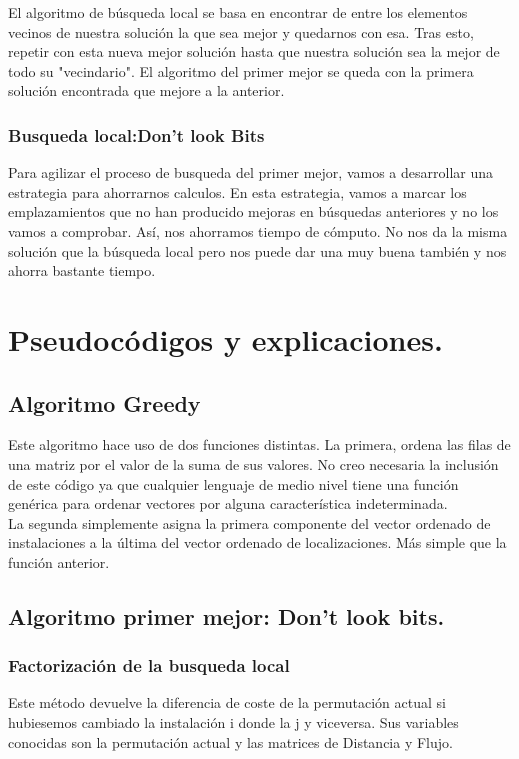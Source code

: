 El algoritmo de búsqueda local se basa en encontrar de entre los elementos vecinos de nuestra solución la que sea mejor y quedarnos con esa. Tras esto, repetir con esta nueva mejor solución hasta que nuestra solución sea la mejor de todo su "vecindario". El algoritmo del primer mejor se queda con la primera solución encontrada que mejore a la anterior.

\subsubsection{Busqueda local:Don't look Bits}
Para agilizar el proceso de busqueda del primer mejor, vamos a desarrollar una estrategia para ahorrarnos calculos. En esta estrategia, vamos a marcar los emplazamientos que no han producido mejoras en búsquedas anteriores y no los vamos a comprobar. Así, nos ahorramos tiempo de cómputo. No nos da la misma solución que la búsqueda local pero nos puede dar una muy buena también y nos ahorra bastante tiempo.

\newpage
\section{Pseudocódigos y explicaciones.}

\subsection{Algoritmo Greedy}
Este algoritmo hace uso de dos funciones distintas. La primera, ordena las filas de una matriz por el valor de la suma de sus valores. No creo necesaria la inclusión de este código ya que cualquier lenguaje de medio nivel tiene una función genérica para ordenar vectores por alguna característica indeterminada. \\
La segunda simplemente asigna la primera componente del vector ordenado de instalaciones a la última del vector ordenado de localizaciones. Más simple que la función anterior.

\subsection{Algoritmo primer mejor: Don't look bits.}

\subsubsection{Factorización de la busqueda local}
Este método devuelve la diferencia de coste de la permutación actual si hubiesemos cambiado la instalación i donde la j y viceversa. Sus variables conocidas son la permutación actual y las matrices de Distancia y Flujo.\\



